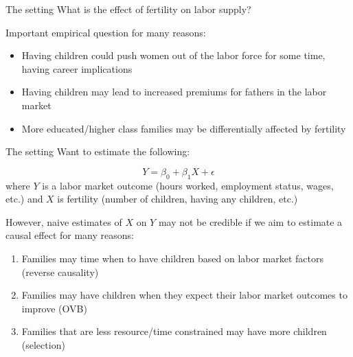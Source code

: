\documentclass[
  ignorenonframetext,
]{beamer}
\providecommand{\tightlist}{%
  \setlength{\itemsep}{0pt}\setlength{\parskip}{0pt}}
\begin{document}
\begin{frame}{The setting}
\label{the-setting}
What is the effect of fertility on labor supply?

Important empirical question for many reasons:

\begin{itemize}
\tightlist
\item
  Having children could push women out of the labor force for some time,
  having career implications
\item
  Having children may lead to increased premiums for fathers in the
  labor market
\item
  More educated/higher class families may be differentially affected by
  fertility
\end{itemize}
\end{frame}

\begin{frame}{The setting}
\label{the-setting-1}
Want to estimate the following:

\[ Y = \beta_0 + \beta_1 X + \epsilon \] where \(Y\) is a labor market
outcome (hours worked, employment status, wages, etc.) and \(X\) is
fertility (number of children, having any children, etc.)

However, naive estimates of \(X\) on \(Y\) may not be credible if we aim
to estimate a causal effect for many reasons:

\begin{enumerate}
\tightlist
\item
  Families may time when to have children based on labor market factors
  (reverse causality)
\item
  Families may have children when they expect their labor market
  outcomes to improve (OVB)
\item
  Families that are less resource/time constrained may have more
  children (selection)
\end{enumerate}
\end{frame}
\end{document}
